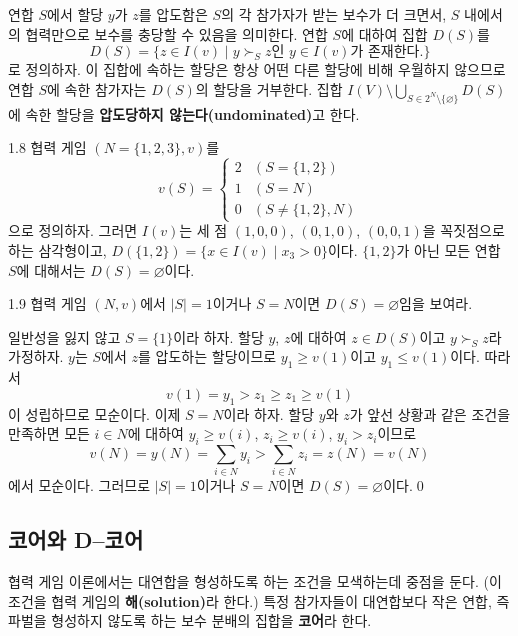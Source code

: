 \documentclass{article}
\numberwithin{equation}{section}
\begin{document}
\noindent 연합 $S$에서 할당 $y$가 $z$를 압도함은 $S$의 각 참가자가 받는 보수가 더 크면서, $S$ 내에서의 협력만으로 보수를 충당할 수 있음을 의미한다. 연합 $S$에 대하여 집합 $D(S)$를
\[
	D(S)=\{z\in I(v)\mid y\succ_Sz\text{인 }y\in I(v)\text{가 존재한다.}\}
\]
로 정의하자. 이 집합에 속하는 할당은 항상 어떤 다른 할당에 비해 우월하지 않으므로 연합 $S$에 속한 참가자는 $D(S)$의 할당을 거부한다. 집합 $I(V)\setminus\bigcup_{S\in 2^N\setminus\{\varnothing\}}D(S)$에 속한 할당을 \textbf{압도당하지 않는다(undominated)}고 한다.

\begin{example}{}{1.8}
	협력 게임 $(N=\{1,2,3\},v)$를
	\[
		v(S)=\begin{cases}
			2 & (S=\{1,2\})\\
			1 & (S=N)\\
			0 & (S\ne\{1,2\},N)
		\end{cases}
	\]
	으로 정의하자. 그러면 $I(v)$는 세 점 $(1,0,0)$, $(0,1,0)$, $(0,0,1)$을 꼭짓점으로 하는 삼각형이고, $D(\{1,2\})=\{x\in I(v)\mid x_3>0\}$이다. $\{1,2\}$가 아닌 모든 연합 $S$에 대해서는 $D(S)=\varnothing$이다.
\end{example}

\begin{prob}{}{1.9}
  협력 게임 $(N,v)$에서 $\vert S\vert=1$이거나 $S=N$이면 $D(S)=\varnothing$임을 보여라.
\end{prob}

\begin{sol}
  일반성을 잃지 않고 $S=\{1\}$이라 하자. 할당 $y$, $z$에 대하여 $z\in D(S)$이고 $y\succ_Sz$라 가정하자. $y$는 $S$에서 $z$를 압도하는 할당이므로 $y_1\geq v(1)$이고 $y_1\leq v(1)$이다. 따라서
  \[
  		v(1)=y_1>z_1\geq z_1\geq v(1)
  \]
  이 성립하므로 모순이다. 이제 $S=N$이라 하자. 할당 $y$와 $z$가 앞선 상황과 같은 조건을 만족하면 모든 $i\in N$에 대하여 $y_i\geq v(i)$, $z_i\geq v(i)$, $y_i>z_i$이므로
  \[
  	v(N)=y(N)=\sum_{i\in N}y_i>\sum_{i\in N}z_i=z(N)=v(N)
  \]
  에서 모순이다. 그러므로 $\vert S\vert=1$이거나 $S=N$이면 $D(S)=\varnothing$이다.\qed
\end{sol}

\subsection{코어와 D--코어}
협력 게임 이론에서는 대연합을 형성하도록 하는 조건을 모색하는데 중점을 둔다. (이 조건을 협력 게임의 \textbf{해(solution)}라 한다.) 특정 참가자들이 대연합보다 작은 연합, 즉 파벌을 형성하지 않도록 하는 보수 분배의 집합을 \textbf{코어}라 한다.
\end{document}
